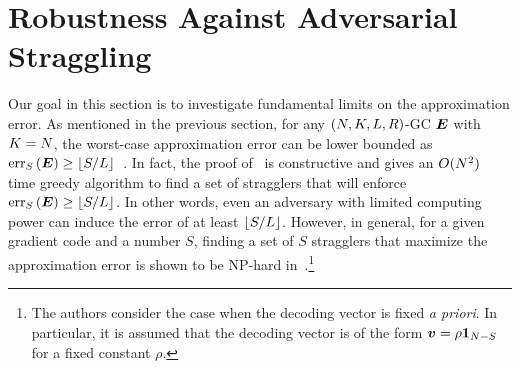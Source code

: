 \documentclass[conference,letterpaper]{IEEEtran}
\begin{document}
\section{Robustness Against Adversarial Straggling}
\label{sec:adversarial}
Our goal in this section is to investigate fundamental limits on the approximation error. As mentioned in the previous section, for any $(N,K,L,R)$-GC $\boldsymbol{E}$ with $K = N$, the worst-case approximation error can be lower bounded as $\mathrm{err}_{S}\left(\boldsymbol{E}\right)\geq \lfloor S/L \rfloor$~\cite[Lemma 21]{Raviv:18}. In fact, the proof of~\cite[Lemma 21]{Raviv:18} is constructive and gives an $O(N^2)$ time greedy algorithm to find a set of stragglers that will enforce $\mathrm{err}_{S}\left(\boldsymbol{E}\right)\geq \lfloor S/L \rfloor$. In other words, even an adversary with limited computing power can induce the error of at least $\lfloor S/L \rfloor$. However, in general, for a given gradient code and a number $S$, finding a set of $S$ stragglers that maximize the approximation error is shown to be NP-hard in~\cite{CharlesP:17}.\footnote{The authors consider the case when the decoding vector is fixed {\it a priori}. In particular, it is assumed that the decoding vector is of the form $\boldsymbol{v} = \rho\boldsymbol{1}_{N-S}$ for a fixed constant $\rho$.}


\end{document}
